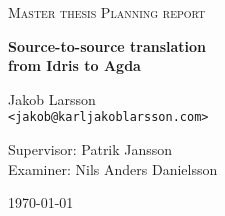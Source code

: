 \documentclass[parskip=half]{scrartcl}
\begin{document}
\begin{titlepage}

\centering
{\scshape\LARGE Master thesis Planning report}


\vspace{0.5cm}
{\huge\bfseries Source-to-source translation\\ from Idris to Agda
  }

\vspace{2cm}
{\Large Jakob Larsson\\}
\texttt{<jakob@karljakoblarsson.com>}

\vspace{1.0cm}
{\large Supervisor: Patrik Jansson  \\
        Examiner: Nils Anders Danielsson}

\vspace{1.5cm}

\vfill
{\large \today}

\end{titlepage}











\end{document}
